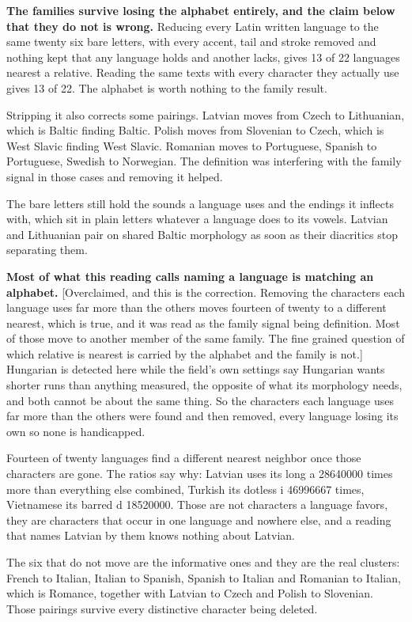 \textbf{The families survive losing the alphabet entirely, and the claim below that they do not is wrong.} Reducing every Latin written language to the same twenty six bare letters, with every accent, tail and stroke removed and nothing kept that any language holds and another lacks, gives 13 of 22 languages nearest a relative. Reading the same texts with every character they actually use gives 13 of 22. The alphabet is worth nothing to the family result.

Stripping it also corrects some pairings. Latvian moves from Czech to Lithuanian, which is Baltic finding Baltic. Polish moves from Slovenian to Czech, which is West Slavic finding West Slavic. Romanian moves to Portuguese, Spanish to Portuguese, Swedish to Norwegian. The definition was interfering with the family signal in those cases and removing it helped.

The bare letters still hold the sounds a language uses and the endings it inflects with, which sit in plain letters whatever a language does to its vowels. Latvian and Lithuanian pair on shared Baltic morphology as soon as their diacritics stop separating them.

\textbf{Most of what this reading calls naming a language is matching an alphabet.} [Overclaimed, and this is the correction. Removing the characters each language uses far more than the others moves fourteen of twenty to a different nearest, which is true, and it was read as the family signal being definition. Most of those move to another member of the same family. The fine grained question of which relative is nearest is carried by the alphabet and the family is not.] Hungarian is detected here while the field's own settings say Hungarian wants shorter runs than anything measured, the opposite of what its morphology needs, and both cannot be about the same thing. So the characters each language uses far more than the others were found and then removed, every language losing its own so none is handicapped.

Fourteen of twenty languages find a different nearest neighbor once those characters are gone. The ratios say why: Latvian uses its long a 28640000 times more than everything else combined, Turkish its dotless i 46996667 times, Vietnamese its barred d 18520000. Those are not characters a language favors, they are characters that occur in one language and nowhere else, and a reading that names Latvian by them knows nothing about Latvian.

The six that do not move are the informative ones and they are the real clusters: French to Italian, Italian to Spanish, Spanish to Italian and Romanian to Italian, which is Romance, together with Latvian to Czech and Polish to Slovenian. Those pairings survive every distinctive character being deleted.

